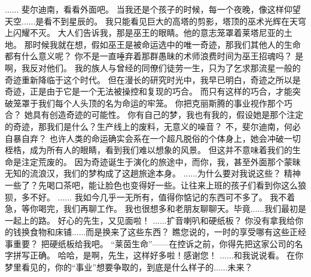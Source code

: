 \documentclass[openany]{book}
\begin{document}
\begin{dialogue}
     ......
     斐尔迪南，看看外面吧。
     当我还是个孩子的时候，每一个夜晚，像这样仰望天空......是看不到星辰的。
     我只能看见巨大的高塔的剪影，塔顶的巫术光辉在天穹上闪耀不灭。
     大人们告诉我，那是巫王的眼睛。他的意志笼罩着莱塔尼亚的土地。
     那时候我就在想，假如巫王是被命运选中的唯一奇迹，那我们其他人的生命都有什么意义呢？
     你不是一直唾弃着那群愚昧的术师浪费时间为巫王招魂吗？
     是啊，我反对他们。
     我的族人与曾经的同僚们徒劳一生，只为了乞求那流星一般的奇迹重新降临于这个时代。
     但在漫长的研究时光中，我早已明白，奇迹之所以是奇迹，正是由于它是一个无法被操控和复现的巧合。
     而只有这样的巧合，才能突破笼罩于我们每个人头顶的名为命运的牢笼。
     你把克丽斯腾的事业视作那个巧合？
     她具有创造奇迹的可能性。
     你有自己的梦，我也有我的，假设她是那个注定的奇迹，那我们是什么？生产线上的废料，无意义的噪音？
     不，斐尔迪南，何必自暴自弃？
     也许人类的命运确实会系在一个超凡脱俗的个体身上，她会冲破一切桎梏，成为所有人的眼睛，看到我们难以想象的风景。
     但这并不意味着我们的生命是注定荒废的。
     因为奇迹诞生于演化的旅途中，而你，我，甚至外面那个蒙昧无知的流浪汉，我们的梦构成了这趟旅途本身。
     ......为什么要对我说这些？
     精神一些了？先喝口茶吧，能让脸色也变得好一些。让往来上班的孩子们看到你这么狼狈，多不好。
     ......
     我如今几乎一无所有，值得你惦记的东西可不多了。
     我不着急，等你喝完，我们再聊工作。
     我也很想多和老朋友聊聊天。毕竟......我们最初是一起上的路。
     好心的先生，又见面啦！
     ......扩音喇叭和硬纸板？
     你没有拿我给你的钱换食物和床铺......而是换来了这些东西？
     瞧您说的，一时的享受哪有这些正经事重要？
     把硬纸板给我吧。
     “莱茵生命”——在控诉之前，你得先把这家公司的名字拼写正确。
     哈哈，是啊，先生，这样好多啦！感谢您！
     ......和我说说看。
     在你梦里看见的，你的“事业”想要争取的，到底是什么样子的......未来？
\end{dialogue}
\end{document}
